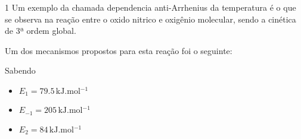 \documentclass[\mainfilename]{subfiles}
\begin{document}
\begin{questionBox}1{ %
    Um exemplo da chamada dependencia anti-Arrhenius da temperatura é o que se observa na reação entre o oxido nitrico e oxigênio molecular, sendo a cinética de 3ª ordem global.
} %
    \begin{center}\large\bfseries
    \end{center}
    
    Um dos mecanismos propostos para esta reação foi o seguinte:

        \begin{BM}[align*]
        \end{BM}
    Sabendo
    \begin{itemize}
        \item \(E_{1}=79.5\,\unit{\kilo\joule.\mole^{-1}}\)
        \item \(E_{-1}=205\,\unit{\kilo\joule.\mole^{-1}}\)
        \item \(E_{2}=84\,\unit{\kilo\joule.\mole^{-1}}\)
    \end{itemize}


\end{questionBox}
\end{document}
